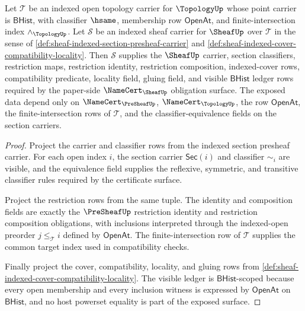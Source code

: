 \begin{theorem}
\label{thm:sheaf-bhist-obligation-surface}
Let $\mathcal{T}$ be an indexed open topology carrier for $\TopologyUp$ whose point carrier is $\mathsf{BHist}$, with classifier $\hsame$, membership row $\mathsf{OpenAt}$, and finite-intersection index $\wedge_{\TopologyUp}$. Let $\mathcal{S}$ be an indexed sheaf carrier for $\SheafUp$ over $\mathcal{T}$ in the sense of \autoref{def:sheaf-indexed-section-presheaf-carrier} and \autoref{def:sheaf-indexed-cover-compatibility-locality}. Then $\mathcal{S}$ supplies the $\SheafUp$ carrier, section classifiers, restriction maps, restriction identity, restriction composition, indexed-cover rows, compatibility predicate, locality field, gluing field, and visible $\mathsf{BHist}$ ledger rows required by the paper-side $\NameCert_{\SheafUp}$ obligation surface. The exposed data depend only on $\NameCert_{\PreSheafUp}$, $\NameCert_{\TopologyUp}$, the row $\mathsf{OpenAt}$, the finite-intersection rows of $\mathcal{T}$, and the classifier-equivalence fields on the section carriers.
\end{theorem}
\begin{proof}
Project the carrier and classifier rows from the indexed section presheaf carrier. For each open index $i$, the section carrier $\mathsf{Sec}(i)$ and classifier $\sim_i$ are visible, and the equivalence field supplies the reflexive, symmetric, and transitive classifier rules required by the certificate surface.

Project the restriction rows from the same tuple. The identity and composition fields are exactly the $\PreSheafUp$ restriction identity and restriction composition obligations, with inclusions interpreted through the indexed-open preorder $j\le_{\mathcal{T}}i$ defined by $\mathsf{OpenAt}$. The finite-intersection row of $\mathcal{T}$ supplies the common target index used in compatibility checks.

Finally project the cover, compatibility, locality, and gluing rows from \autoref{def:sheaf-indexed-cover-compatibility-locality}. The visible ledger is $\mathsf{BHist}$-scoped because every open membership and every inclusion witness is expressed by $\mathsf{OpenAt}$ on $\mathsf{BHist}$, and no host powerset equality is part of the exposed surface.
\end{proof}


